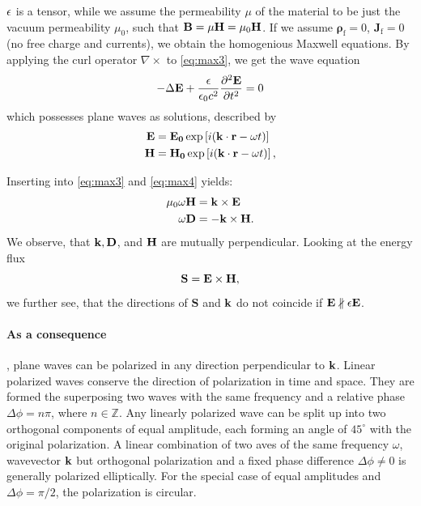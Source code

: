 $\mathbf{\epsilon}$ is a tensor, while we assume the permeability $\mu$ of the material 
to be just the vacuum permeability $\mu_0$, such that
$\mathbf{B} = \mu \mathbf{H} = \mu_0 \mathbf{H}$. 
If we assume $\mathbf{\rho}_\text{f} = 0$, $\mathbf{J}_\text{f} = 0$ 
(no free charge and currents), we obtain the homogenious 
Maxwell equations. By applying the curl operator $\nabla \times$ 
to \eqref{eq:max3}, we get the wave equation 
\begin{equation}
    - \Delta \mathbf{E} + \frac{\epsilon}{\epsilon_0 c^2} \frac{\partial^2 \mathbf{E}}{\partial t^2}  = 0
    \label{eq:wave_eq}
\end{equation}
which possesses plane waves as solutions, 
described by
\begin{subequations}
\begin{align}
    \mathbf{E} &= \mathbf{E_0} \exp \left[i(\mathbf{k \cdot r}-\omega t)\right] \\
    \mathbf{H} &= \mathbf{H_0} \exp \left[i(\mathbf{k \cdot r}-\omega t)\right], 
\end{align}
\end{subequations}

Inserting into \eqref{eq:max3} and \eqref{eq:max4} yields:
\begin{subequations}
\begin{align}
    \mu_0 \omega \mathbf{H} &= \mathbf{k} \times \mathbf{E} 
    \label{eq:plan_H} \\
    \omega \mathbf{D} &= - \mathbf{k} \times \mathbf{H}.
    \label{eq:plan_D} 
\end{align}
\end{subequations}
We observe, that $\mathbf{k}, \mathbf{D}$, and $\mathbf{H}$ are mutually perpendicular. 
Looking at the energy flux
\begin{equation}
    \mathbf{S} = \mathbf{E} \times \mathbf{H}, 
\end{equation}
we further see, that the directions of $\mathbf{S}$ and $\mathbf{k}$ do not 
coincide if $\mathbf{E} \nparallel \mathbf{\epsilon} \mathbf{E}$. 

\paragraph{As a consequence}, 
plane waves can be polarized in any direction 
perpendicular to $\mathbf{k}$. Linear polarized waves conserve the 
direction of polarization in time and space. They are formed 
the superposing two waves with the same frequency and a 
relative phase $\Delta \phi = n \pi$, where $n \in \mathbb{Z}$. 
Any linearly polarized wave can be split up into two orthogonal 
components of equal amplitude, each forming an angle of $45^\circ$ 
with the original polarization.
A linear combination of two aves of the same frequency $\omega$, 
wavevector $\mathbf{k}$ but orthogonal polarization and a fixed phase 
difference $\Delta \phi \neq 0$ is generally polarized elliptically.
For the special case of equal amplitudes and $\Delta \phi = \pi /2$,
the polarization is circular. 

